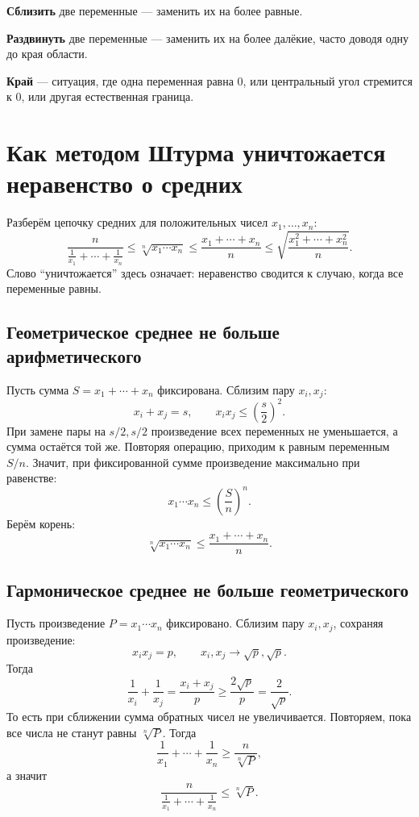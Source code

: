 \begin{tcolorbox}[
    enhanced,
    breakable,
    colback=gray!10,
    colframe=blue!70!black,
    colbacktitle=blue!85!black,
    coltitle=white,
    fonttitle=\bfseries,
    title=Мини-словарь,
    boxrule=0.8pt,
    arc=2mm
]
\textbf{Сблизить} две переменные --- заменить их на более равные.\par
\textbf{Раздвинуть} две переменные --- заменить их на более далёкие, часто доводя одну до края области.\par
\textbf{Край} --- ситуация, где одна переменная равна $0$, или центральный угол стремится к $0$, или другая естественная граница.
\end{tcolorbox}

\chapter{Как методом Штурма уничтожается неравенство о средних}

Разберём цепочку средних для положительных чисел $x_1,\ldots,x_n$:
\[
\frac{n}{\frac1{x_1}+\cdots+\frac1{x_n}}
\le
\sqrt[n]{x_1\cdots x_n}
\le
\frac{x_1+\cdots+x_n}{n}
\le
\sqrt{\frac{x_1^2+\cdots+x_n^2}{n}}.
\]
Слово ``уничтожается'' здесь означает: неравенство сводится к случаю, когда все переменные равны.

\section{Геометрическое среднее не больше арифметического}

Пусть сумма $S=x_1+\cdots+x_n$ фиксирована. Сблизим пару $x_i,x_j$:
\[
    x_i+x_j=s,\qquad x_i x_j\le\left(\frac{s}{2}\right)^2.
\]
При замене пары на $s/2,s/2$ произведение всех переменных не уменьшается, а сумма остаётся той же. Повторяя операцию, приходим к равным переменным $S/n$. Значит, при фиксированной сумме произведение максимально при равенстве:
\[
    x_1\cdots x_n\le\left(\frac{S}{n}\right)^n.
\]
Берём корень:
\[
    \sqrt[n]{x_1\cdots x_n}\le\frac{x_1+\cdots+x_n}{n}.
\]

\section{Гармоническое среднее не больше геометрического}

Пусть произведение $P=x_1\cdots x_n$ фиксировано. Сблизим пару $x_i,x_j$, сохраняя произведение:
\[
    x_i x_j=p,
    \qquad
    x_i,x_j\longrightarrow \sqrt p,\sqrt p.
\]
Тогда
\[
    \frac1{x_i}+\frac1{x_j}
    =\frac{x_i+x_j}{p}
    \ge\frac{2\sqrt p}{p}
    =\frac{2}{\sqrt p}.
\]
То есть при сближении сумма обратных чисел не увеличивается. Повторяем, пока все числа не станут равны $\sqrt[n]{P}$. Тогда
\[
    \frac1{x_1}+\cdots+\frac1{x_n}\ge \frac{n}{\sqrt[n]{P}},
\]
а значит
\[
    \frac{n}{\frac1{x_1}+\cdots+\frac1{x_n}}
    \le \sqrt[n]{P}.
\]

